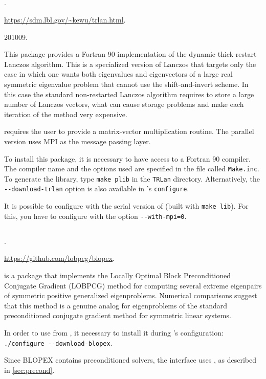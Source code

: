 \subsection*{\underline{\trlan}}
\begin{description}
\setlength{\itemsep}{0pt}
\item[References.]\citep{Wu:2000:TLM}.
\item[Website.] \url{https://sdm.lbl.gov/\~kewu/trlan.html}.
\item[Version.] 201009.
\item[Summary.] This package provides a Fortran 90 implementation of the dynamic thick-restart Lanczos algorithm. This is a specialized version of Lanczos that targets only the case in which one wants both eigenvalues and eigenvectors of a large real symmetric eigenvalue problem that cannot use the shift-and-invert scheme. In this case the standard non-restarted Lanczos algorithm requires to store a large number of Lanczos vectors, what can cause storage problems and make each iteration of the method very expensive.

\trlan{} requires the user to provide a matrix-vector multiplication routine. The parallel version uses MPI as the message passing layer.
\item[Installation.] To install this package, it is necessary to have access to a Fortran 90 compiler. The compiler name and the options used are specified in the file called \texttt{Make.inc}. To generate the library, type \texttt{make plib} in the \texttt{TRLan} directory. Alternatively, the \texttt{-{}-download-trlan} option is also available in \slepc's \texttt{configure}.

It is possible to configure \slepc with the serial version of \trlan (built with \texttt{make lib}). For this, you have to configure \petsc with the option \texttt{-{}-with-mpi=0}.
\end{description}

\subsection*{\underline{\blopex}}
\begin{description}
\setlength{\itemsep}{0pt}
\item[References.]\citep{Knyazev:2007:BLO}.
\item[Website.] \url{https://github.com/lobpcg/blopex}.
\item[Summary.] \blopex is a package that implements the Locally Optimal Block Preconditioned Conjugate Gradient (LOBPCG) method for computing several extreme eigenpairs of symmetric positive generalized eigenproblems. Numerical comparisons suggest that this method is a genuine analog for eigenproblems of the standard preconditioned conjugate gradient method for symmetric linear systems.
\item[Installation.] In order to use \blopex from \slepc, it necessary to install it during \slepc's configuration: \Verb!./configure --download-blopex!.
\item[Specific options.] Since BLOPEX contains preconditioned solvers, the \slepc interface uses , as described in \ref{sec:precond}.
\end{description}

